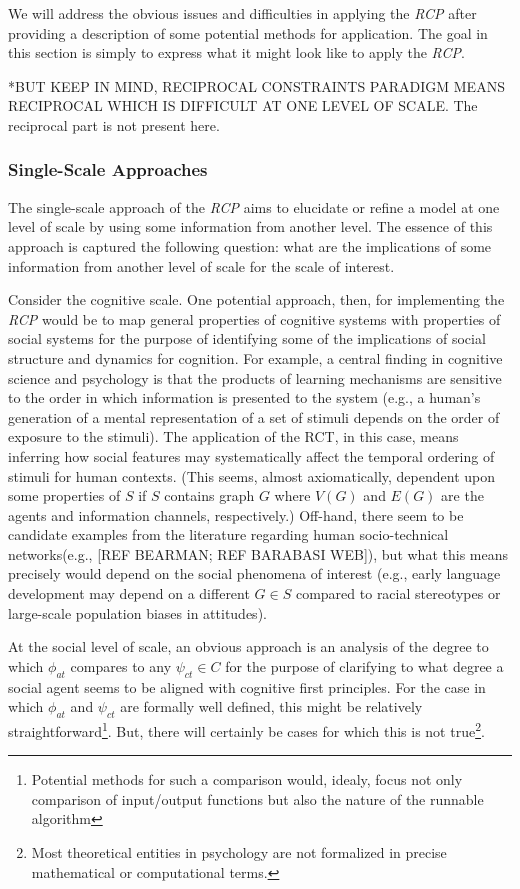 \documentclass{article}
\begin{document}
We will address the obvious issues and difficulties in applying the \textit{RCP} after providing a description of some potential methods for application.  The goal in this section is simply to express what it might look like to apply the \textit{RCP}.  

*BUT KEEP IN MIND, RECIPROCAL CONSTRAINTS PARADIGM MEANS RECIPROCAL WHICH IS DIFFICULT AT ONE LEVEL OF SCALE.  The reciprocal part is not present here.

\subsubsection{Single-Scale Approaches}
The single-scale approach of the \textit{RCP} aims to elucidate or refine a model at one level of scale by using some information from another level.  The essence of this approach is captured the following question: what are the implications of some information from another level of scale for the scale of interest. 

Consider the cognitive scale. One potential approach, then, for implementing the \textit{RCP} would be to map general properties of cognitive systems with properties of social systems for the purpose of identifying some of the implications of social structure and dynamics for cognition.  For example, a central finding in cognitive science and psychology is that the products of learning mechanisms are sensitive to the order in which information is presented to the system (e.g., a human's generation of a mental representation of a set of stimuli depends on the order of exposure to the stimuli).  The application of the RCT, in this case, means inferring how social features may systematically affect the temporal ordering of stimuli for human contexts. (This seems, almost axiomatically, dependent upon some properties of $S$ if $S$ contains graph $G$ where $V(G)$ and $E(G)$ are the agents and information channels, respectively.)  Off-hand, there seem to be candidate examples from the literature regarding human socio-technical networks(e.g., [REF BEARMAN; REF BARABASI WEB]), but what this means precisely would depend on the social phenomena of interest (e.g., early language development may depend on a different $G \in S$ compared to racial stereotypes or large-scale population biases in attitudes).  

At the social level of scale, an obvious approach is an analysis of the degree to which $\phi_{at}$ compares to any $\psi_{ct} \in C$ for the purpose of clarifying to what degree a social agent seems to be aligned with cognitive first principles.  For the case in which $\phi_{at}$ and $\psi_{ct}$ are formally well defined, this might be relatively straightforward\footnote{Potential methods for such a comparison would, idealy, focus not only comparison of input/output functions but also the nature of the runnable algorithm}.  But, there will certainly be cases for which this is not true\footnote{Most theoretical entities in psychology are not formalized in precise mathematical or computational terms.}.  
\end{document}
